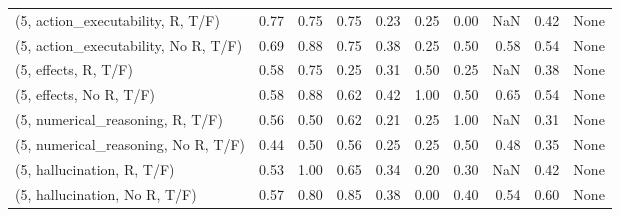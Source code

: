 \begin{table*}[h!]
\begin{adjustbox}{width=2\columnwidth,center}
\begin{tabular}{lrrr|rrr|rrr}
(5, action\_executability, R, T/F)    &                      0.77 &                  0.75 &                      0.75 &                          0.23 &                      0.25 &                          0.00 &                                    NaN &                               0.42 &                                  None \\
(5, action\_executability, No R, T/F) &                      0.69 &                  0.88 &                      0.75 &                          0.38 &                      0.25 &                          0.50 &                                   0.58 &                               0.54 &                                  None \\
(5, effects, R, T/F)                 &                      0.58 &                  0.75 &                      0.25 &                          0.31 &                      0.50 &                          0.25 &                                    NaN &                               0.38 &                                  None \\
(5, effects, No R, T/F)              &                      0.58 &                  0.88 &                      0.62 &                          0.42 &                      1.00 &                          0.50 &                                   0.65 &                               0.54 &                                  None \\
(5, numerical\_reasoning, R, T/F)     &                      0.56 &                  0.50 &                      0.62 &                          0.21 &                      0.25 &                          1.00 &                                    NaN &                               0.31 &                                  None \\
(5, numerical\_reasoning, No R, T/F)  &                      0.44 &                  0.50 &                      0.56 &                          0.25 &                      0.25 &                          0.50 &                                   0.48 &                               0.35 &                                  None \\
(5, hallucination, R, T/F)           &                      0.53 &                  1.00 &                      0.65 &                          0.34 &                      0.20 &                          0.30 &                                    NaN &                               0.42 &                                  None \\
(5, hallucination, No R, T/F)        &                      0.57 &                  0.80 &                      0.85 &                          0.38 &                      0.00 &                          0.40 &                                   0.54 &                               0.60 &                                  None \\

\end{tabular}
\end{adjustbox}
\end{table*}
